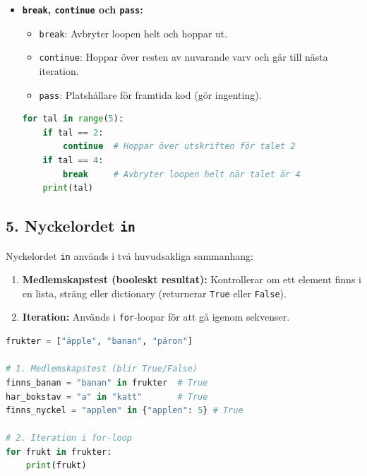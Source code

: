 \documentclass{article}
\begin{document}
\begin{itemize}
    \begin{lstlisting}[language=Python]
        frukter = ["äpple", "banan", "päron"]

        # SÄTT 1: for-loop med range(len(...))
        for i in range(len(frukter)):
            print(f"Index {i}: {frukter[i]}")

        # SÄTT 2: Omgjord till while-loop
        i = 0                        # 1. Starta räknaren på index 0
        while i < len(frukter):      # 2. Loopa så länge i är mindre än listans längd
            print(f"Index {i}: {frukter[i]}")
            i += 1                   # 3. GLÖM INTE att öka räknaren varje varv!
    \end{lstlisting}

    \item \textbf{\texttt{break}, \texttt{continue} och \texttt{pass}:}
    \begin{itemize}
        \item \texttt{break}: Avbryter loopen helt och hoppar ut.
        \item \texttt{continue}: Hoppar över resten av nuvarande varv och går till nästa iteration.
        \item \texttt{pass}: Platshållare för framtida kod (gör ingenting).
    \end{itemize}
\begin{lstlisting}[language=Python]
for tal in range(5):
    if tal == 2:
        continue  # Hoppar över utskriften för talet 2
    if tal == 4:
        break     # Avbryter loopen helt när talet är 4
    print(tal)
\end{lstlisting}
\end{itemize}

\subsection*{5. Nyckelordet \texttt{in}}
Nyckelordet \texttt{in} används i två huvudsakliga sammanhang:
\begin{enumerate}
    \item \textbf{Medlemskapstest (booleskt resultat):} Kontrollerar om ett element finns i en lista, sträng eller dictionary (returnerar \texttt{True} eller \texttt{False}).
    \item \textbf{Iteration:} Används i \texttt{for}-loopar för att gå igenom sekvenser.
\end{enumerate}
\begin{lstlisting}[language=Python]
frukter = ["äpple", "banan", "päron"]

# 1. Medlemskapstest (blir True/False)
finns_banan = "banan" in frukter  # True
har_bokstav = "a" in "katt"       # True
finns_nyckel = "applen" in {"applen": 5} # True

# 2. Iteration i for-loop
for frukt in frukter:
    print(frukt)
\end{lstlisting}
\end{document}
